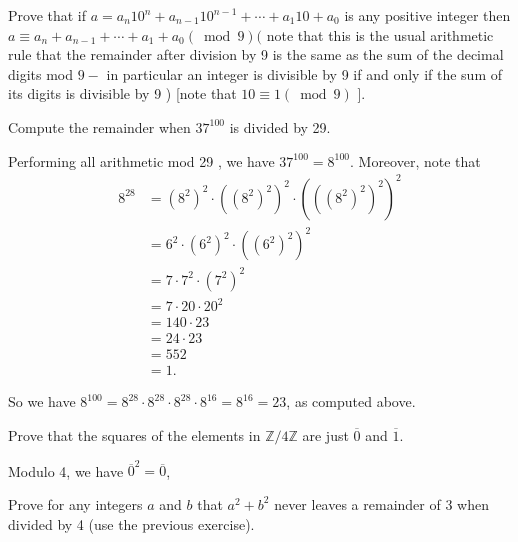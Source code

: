 \begin{questions}
\begin{solution}
\end{solution}

\question
    Prove that if \(a=a_n 10^n+a_{n-1} 10^{n-1}+\cdots+a_1 10+a_0\) is any positive integer then \(a \equiv a_n+a_{n-1}+\cdots+a_1+a_0(\bmod 9)(\) note that this is the usual arithmetic rule that the remainder after division by 9 is the same as the sum of the decimal digits mod \(9-\) in particular an integer is divisible by 9 if and only if the sum of its digits is divisible by 9 ) [note that \(10 \equiv 1(\bmod 9)\) ].


\begin{solution}
    
\end{solution}

\question
    Compute the remainder when \(37^{100}\) is divided by 29.

\begin{solution}
    Performing all arithmetic mod 29 , we have \(37^{100}=8^{100}\). Moreover, note that
\[
\begin{aligned}
8^{28} & =\left(8^2\right)^2 \cdot\left(\left(8^2\right)^2\right)^2 \cdot\left(\left(\left(8^2\right)^2\right)^2\right)^2 \\
& =6^2 \cdot\left(6^2\right)^2 \cdot\left(\left(6^2\right)^2\right)^2 \\
& =7 \cdot 7^2 \cdot\left(7^2\right)^2 \\
& =7 \cdot 20 \cdot 20^2 \\
& =140 \cdot 23 \\
& =24 \cdot 23 \\
& =552 \\
& =1 .
\end{aligned}
\]

So we have \(8^{100}=8^{28} \cdot 8^{28} \cdot 8^{28} \cdot 8^{16}=8^{16}=23\), as computed above.
\end{solution}

\question
    Prove that the squares of the elements in \(\mathbb{Z} / 4 \mathbb{Z}\) are just \(\overline{0}\) and \(\overline{1}\).
\begin{solution}
    Modulo 4, we have \(\overline{0}^2 = \overline{0}\), 
\end{solution}

\question
    Prove for any integers \(a\) and \(b\) that \(a^2+b^2\) never leaves a remainder of 3 when divided by 4 (use the previous exercise).



\end{questions}
